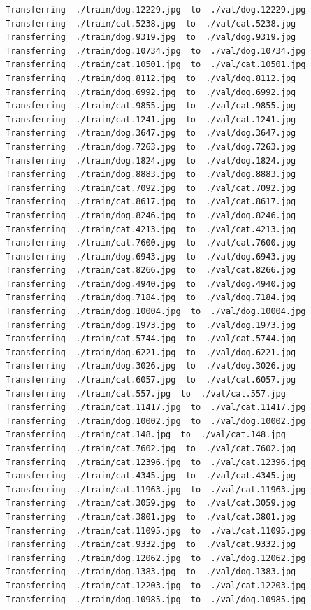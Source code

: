 \documentclass[]{book}
\theoremstyle{definition}
\theoremstyle{definition}
\theoremstyle{definition}
\theoremstyle{remark}
\begin{document}
\begin{verbatim}
Transferring  ./train/dog.12229.jpg  to  ./val/dog.12229.jpg
Transferring  ./train/cat.5238.jpg  to  ./val/cat.5238.jpg
Transferring  ./train/dog.9319.jpg  to  ./val/dog.9319.jpg
Transferring  ./train/dog.10734.jpg  to  ./val/dog.10734.jpg
Transferring  ./train/cat.10501.jpg  to  ./val/cat.10501.jpg
Transferring  ./train/dog.8112.jpg  to  ./val/dog.8112.jpg
Transferring  ./train/dog.6992.jpg  to  ./val/dog.6992.jpg
Transferring  ./train/cat.9855.jpg  to  ./val/cat.9855.jpg
Transferring  ./train/cat.1241.jpg  to  ./val/cat.1241.jpg
Transferring  ./train/dog.3647.jpg  to  ./val/dog.3647.jpg
Transferring  ./train/dog.7263.jpg  to  ./val/dog.7263.jpg
Transferring  ./train/dog.1824.jpg  to  ./val/dog.1824.jpg
Transferring  ./train/dog.8883.jpg  to  ./val/dog.8883.jpg
Transferring  ./train/cat.7092.jpg  to  ./val/cat.7092.jpg
Transferring  ./train/cat.8617.jpg  to  ./val/cat.8617.jpg
Transferring  ./train/dog.8246.jpg  to  ./val/dog.8246.jpg
Transferring  ./train/cat.4213.jpg  to  ./val/cat.4213.jpg
Transferring  ./train/cat.7600.jpg  to  ./val/cat.7600.jpg
Transferring  ./train/dog.6943.jpg  to  ./val/dog.6943.jpg
Transferring  ./train/cat.8266.jpg  to  ./val/cat.8266.jpg
Transferring  ./train/dog.4940.jpg  to  ./val/dog.4940.jpg
Transferring  ./train/dog.7184.jpg  to  ./val/dog.7184.jpg
Transferring  ./train/dog.10004.jpg  to  ./val/dog.10004.jpg
Transferring  ./train/dog.1973.jpg  to  ./val/dog.1973.jpg
Transferring  ./train/cat.5744.jpg  to  ./val/cat.5744.jpg
Transferring  ./train/dog.6221.jpg  to  ./val/dog.6221.jpg
Transferring  ./train/dog.3026.jpg  to  ./val/dog.3026.jpg
Transferring  ./train/cat.6057.jpg  to  ./val/cat.6057.jpg
Transferring  ./train/cat.557.jpg  to  ./val/cat.557.jpg
Transferring  ./train/cat.11417.jpg  to  ./val/cat.11417.jpg
Transferring  ./train/dog.10002.jpg  to  ./val/dog.10002.jpg
Transferring  ./train/cat.148.jpg  to  ./val/cat.148.jpg
Transferring  ./train/cat.7602.jpg  to  ./val/cat.7602.jpg
Transferring  ./train/cat.12396.jpg  to  ./val/cat.12396.jpg
Transferring  ./train/cat.4345.jpg  to  ./val/cat.4345.jpg
Transferring  ./train/cat.11963.jpg  to  ./val/cat.11963.jpg
Transferring  ./train/cat.3059.jpg  to  ./val/cat.3059.jpg
Transferring  ./train/cat.3801.jpg  to  ./val/cat.3801.jpg
Transferring  ./train/cat.11095.jpg  to  ./val/cat.11095.jpg
Transferring  ./train/cat.9332.jpg  to  ./val/cat.9332.jpg
Transferring  ./train/dog.12062.jpg  to  ./val/dog.12062.jpg
Transferring  ./train/dog.1383.jpg  to  ./val/dog.1383.jpg
Transferring  ./train/cat.12203.jpg  to  ./val/cat.12203.jpg
Transferring  ./train/dog.10985.jpg  to  ./val/dog.10985.jpg

\end{verbatim}
\end{document}
